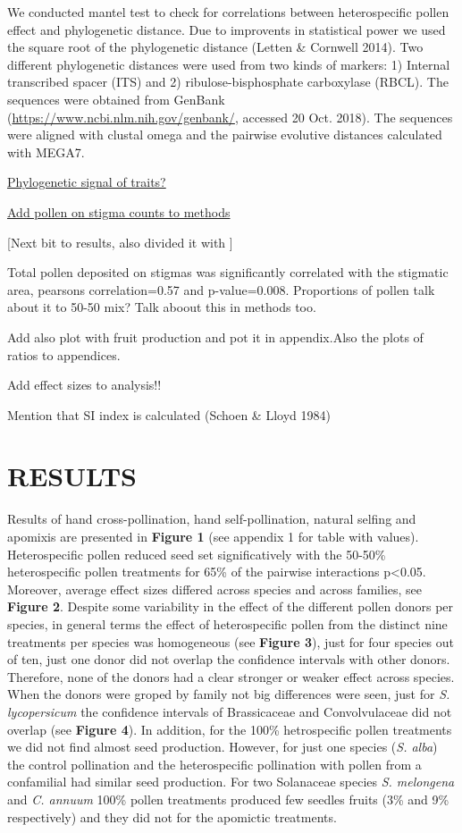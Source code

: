 \documentclass[11pt,a4paper]{article}
\begin{document}
We conducted mantel test to check for correlations between
heterospecific pollen effect and phylogenetic distance. Due to
improvents in statistical power we used the square root of the
phylogenetic distance (Letten \& Cornwell 2014). Two different
phylogenetic distances were used from two kinds of markers: 1) Internal
transcribed spacer (ITS) and 2) ribulose-bisphosphate carboxylase
(RBCL). The sequences were obtained from GenBank
(\url{https://www.ncbi.nlm.nih.gov/genbank/}, accessed 20 Oct. 2018).
The sequences were aligned with clustal omega and the pairwise evolutive
distances calculated with MEGA7.

\href{Jose}{Phylogenetic signal of traits?}

\href{Jose}{Add pollen on stigma counts to methods}

{[}Next bit to results, also divided it with {]}

Total pollen deposited on stigmas was significantly correlated with the
stigmatic area, pearsons correlation=0.57 and p-value=0.008. Proportions
of pollen talk about it to 50-50 mix? Talk aboout this in methods too.

Add also plot with fruit production and pot it in appendix.Also the
plots of ratios to appendices.

Add effect sizes to analysis!!

Mention that SI index is calculated (Schoen \& Lloyd 1984)

\section{RESULTS}\label{results}

Results of hand cross-pollination, hand self-pollination, natural
selfing and apomixis are presented in \textbf{Figure 1} (see appendix 1
for table with values). Heterospecific pollen reduced seed set
significatively with the 50-50\% heterospecific pollen treatments for
65\% of the pairwise interactions p\textless{}0.05. Moreover, average
effect sizes differed across species and across families, see
\textbf{Figure 2}. Despite some variability in the effect of the
different pollen donors per species, in general terms the effect of
heterospecific pollen from the distinct nine treatments per species was
homogeneous (see \textbf{Figure 3}), just for four species out of ten,
just one donor did not overlap the confidence intervals with other
donors. Therefore, none of the donors had a clear stronger or weaker
effect across species. When the donors were groped by family not big
differences were seen, just for \emph{S. lycopersicum} the confidence
intervals of Brassicaceae and Convolvulaceae did not overlap (see
\textbf{Figure 4}). In addition, for the 100\% hetrospecific pollen
treatments we did not find almost seed production. However, for just one
species (\emph{S. alba}) the control pollination and the heterospecific
pollination with pollen from a confamilial had similar seed production.
For two Solanaceae species \emph{S. melongena} and \emph{C. annuum}
100\% pollen treatments produced few seedles fruits (3\% and 9\%
respectively) and they did not for the apomictic treatments.
\end{document}
